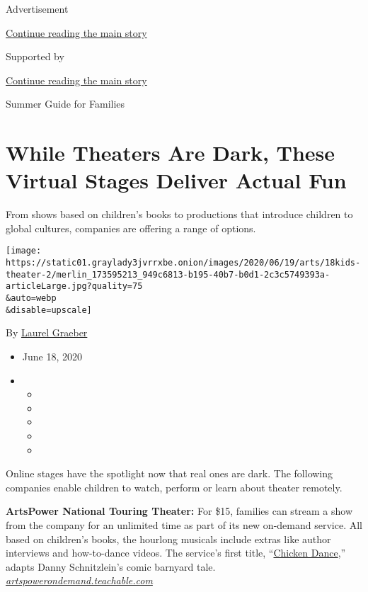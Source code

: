 Advertisement

\protect\hyperlink{after-top}{Continue reading the main story}

Supported by

\protect\hyperlink{after-sponsor}{Continue reading the main story}

Summer Guide for Families

\hypertarget{while-theaters-are-dark-these-virtual-stages-deliver-actual-fun}{%
\section{While Theaters Are Dark, These Virtual Stages Deliver Actual
Fun}\label{while-theaters-are-dark-these-virtual-stages-deliver-actual-fun}}

From shows based on children's books to productions that introduce
children to global cultures, companies are offering a range of options.

\texttt{[image: https://static01.graylady3jvrrxbe.onion/images/2020/06/19/arts/18kids-theater-2/merlin\_173595213\_949c6813-b195-40b7-b0d1-2c3c5749393a-articleLarge.jpg?quality=75\\\&auto=webp\\\&disable=upscale]}

By \href{https://www.nytimes3xbfgragh.onion/by/laurel-graeber}{Laurel
Graeber}

\begin{itemize}
\item
  June 18, 2020
\item
  \begin{itemize}
  \item
  \item
  \item
  \item
  \item
  \end{itemize}
\end{itemize}

Online stages have the spotlight now that real ones are dark. The
following companies enable children to watch, perform or learn about
theater remotely.

\textbf{ArtsPower National Touring Theater:} For \$15, families can
stream a show from the company for an unlimited time as part of its new
on-demand service. All based on children's books, the hourlong musicals
include extras like author interviews and how-to-dance videos. The
service's first title,
``\href{https://artspowerondemand.teachable.com/courses}{Chicken
Dance},'' adapts Danny Schnitzlein's comic barnyard tale.\\
\href{https://artspowerondemand.teachable.com/}{\emph{artspowerondemand.teachable.com}}

